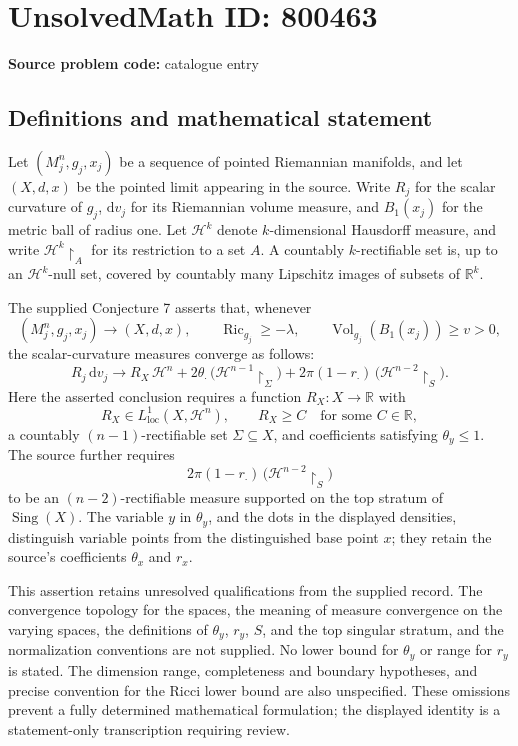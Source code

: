 \documentclass[11pt]{article}
\newcommand{\R}{\mathbb{R}}
\begin{document}
\section*{UnsolvedMath ID: 800463}
\textbf{Source problem code:} catalogue entry
\subsection{Definitions and mathematical statement}
Let \((M_j^n,g_j,x_j)\) be a sequence of pointed Riemannian manifolds, and let \((X,d,x)\) be the pointed limit appearing in the source. Write \(R_j\) for the scalar curvature of \(g_j\), \(\mathrm{d}v_j\) for its Riemannian volume measure, and \(B_1(x_j)\) for the metric ball of radius one. Let \(\mathcal H^k\) denote \(k\)-dimensional Hausdorff measure, and write \(\mathcal H^k\!\restriction_A\) for its restriction to a set \(A\). A countably \(k\)-rectifiable set is, up to an \(\mathcal H^k\)-null set, covered by countably many Lipschitz images of subsets of \(\R^k\).

The supplied Conjecture 7 asserts that, whenever
\[
(M_j^n,g_j,x_j)\longrightarrow(X,d,x),\qquad
\operatorname{Ric}_{g_j}\geq-\lambda,\qquad
\operatorname{Vol}_{g_j}(B_1(x_j))\geq v>0,
\]
the scalar-curvature measures converge as follows:
\[
R_j\,\mathrm{d}v_j\longrightarrow
R_X\,\mathcal H^n
+2\theta_{\cdot}\,\bigl(\mathcal H^{n-1}\!\restriction_{\Sigma}\bigr)
+2\pi(1-r_{\cdot})\,\bigl(\mathcal H^{n-2}\!\restriction_S\bigr).
\]
Here the asserted conclusion requires a function \(R_X\colon X\to\R\) with
\[
R_X\in L^1_{\mathrm{loc}}(X,\mathcal H^n),\qquad
R_X\geq C\quad\text{for some }C\in\R,
\]
a countably \((n-1)\)-rectifiable set \(\Sigma\subseteq X\), and coefficients satisfying \(\theta_y\leq1\). The source further requires
\[
2\pi(1-r_{\cdot})\,\bigl(\mathcal H^{n-2}\!\restriction_S\bigr)
\]
to be an \((n-2)\)-rectifiable measure supported on the top stratum of \(\operatorname{Sing}(X)\). The variable \(y\) in \(\theta_y\), and the dots in the displayed densities, distinguish variable points from the distinguished base point \(x\); they retain the source's coefficients \(\theta_x\) and \(r_x\).

This assertion retains unresolved qualifications from the supplied record. The convergence topology for the spaces, the meaning of measure convergence on the varying spaces, the definitions of \(\theta_y\), \(r_y\), \(S\), and the top singular stratum, and the normalization conventions are not supplied. No lower bound for \(\theta_y\) or range for \(r_y\) is stated. The dimension range, completeness and boundary hypotheses, and precise convention for the Ricci lower bound are also unspecified. These omissions prevent a fully determined mathematical formulation; the displayed identity is a statement-only transcription requiring review.
\end{document}
